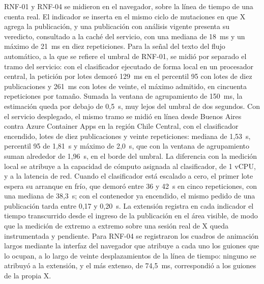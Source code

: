 RNF-01 y RNF-04 se midieron en el navegador, sobre la línea de tiempo de una cuenta real. El indicador se inserta en el mismo ciclo de mutaciones en que X agrega la publicación, y una publicación con análisis vigente presenta su veredicto, consultado a la caché del servicio, con una mediana de 18~ms y un máximo de 21~ms en diez repeticiones. Para la señal del texto del flujo automático, a la que se refiere el umbral de RNF-01, se midió por separado el tramo del servicio: con el clasificador ejecutado de forma local en un procesador central, la petición por lotes demoró 129~ms en el percentil 95 con lotes de diez publicaciones y 261~ms con lotes de veinte, el máximo admitido, en cincuenta repeticiones por tamaño. Sumada la ventana de agrupamiento de 150~ms, la estimación queda por debajo de 0,5~s, muy lejos del umbral de dos segundos. Con el servicio desplegado, el mismo tramo se midió en línea desde Buenos Aires contra Azure Container Apps en la región Chile Central, con el clasificador encendido, lotes de diez publicaciones y veinte repeticiones: mediana de 1,53~s, percentil 95 de 1,81~s y máximo de 2,0~s, que con la ventana de agrupamiento suman alrededor de 1,96~s, en el borde del umbral. La diferencia con la medición local se atribuye a la capacidad de cómputo asignada al clasificador, de 1 vCPU, y a la latencia de red. Cuando el clasificador está escalado a cero, el primer lote espera su arranque en frío, que demoró entre 36 y 42~s en cinco repeticiones, con una mediana de 38,3~s; con el contenedor ya encendido, el mismo pedido de una publicación tarda entre 0,17 y 0,20~s. La extensión registra en cada indicador el tiempo transcurrido desde el ingreso de la publicación en el área visible, de modo que la medición de extremo a extremo sobre una sesión real de X queda instrumentada y pendiente. Para RNF-04 se registraron los cuadros de animación largos mediante la interfaz del navegador que atribuye a cada uno los guiones que lo ocupan, a lo largo de veinte desplazamientos de la línea de tiempo: ninguno se atribuyó a la extensión, y el más extenso, de 74,5~ms, correspondió a los guiones de la propia X.

